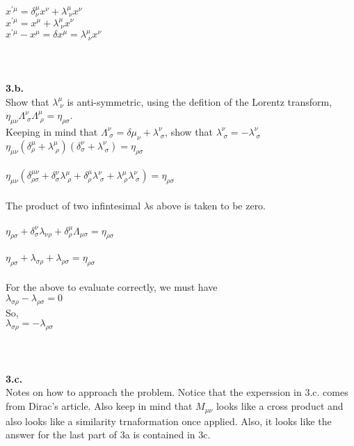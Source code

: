 \documentclass[prb,preprint]
{revtex4-1}
\newcommand{\PRLsep}{\noindent\makebox[\linewidth]{\resizebox{0.8888\linewidth}{2pt}{$\bullet$}}\bigskip}
\begin{document}
\\
$x^{\prime\mu} = \delta^\mu_\nu x^\nu + \lambda^\mu_{\;\nu}x^\nu $
\\
$x^{\prime\mu} = x^\mu + \lambda^\mu_{\;\nu}x^\nu $
\\
$x^{\prime\mu} - x^\mu = \delta x^\mu = \lambda^\mu_{\;\nu}x^\nu $
\\
\\
\PRLsep
\\
\\
\newpage
\textbf{3.b.}
\\
Show that $\lambda^\mu_{\;\nu}$ is anti-symmetric, using the defition of the Lorentz transform, $\eta_{\mu\nu} \Lambda^\nu_{\;\sigma}\Lambda^\mu_{\;\rho} = \eta_{\rho\sigma}$.
\\
Keeping in mind that $\Lambda^\nu_{\;\sigma} = \delta\mu_\nu + \lambda^\nu_{\;\sigma}$, show that $\lambda^\nu_{\;\sigma} = -\lambda^\nu_{\;\sigma}$
\\
$\eta_{\mu\nu}\left(\delta^\mu_\rho+ \lambda^\mu_{\;\rho}\right)\left(\delta^\nu_\sigma + \lambda^\nu_{\;\sigma}\right) = \eta_{\rho\sigma}$
\\
\\
$\eta_{\mu\nu}\left(\delta^{\mu\nu}_{\rho\sigma} + \delta^\nu_\sigma \lambda^\mu_{\;\rho} + \delta^\mu_\rho \lambda^\nu_{\;\sigma} + \lambda^\mu_{\;\rho}\lambda^\nu_{\;\sigma}\right) = \eta_{\rho\sigma}$
\\
\\
The product of two infintesimal $\lambda$s above is taken to be zero.
\\
\\
$\eta_{\rho\sigma} + \delta^\nu_\sigma \lambda_{\nu\rho} + \delta^\mu_\rho\Lambda_{\mu\sigma} = \eta_{\rho\sigma}$
\\
\\
$\eta_{\rho\sigma} + \lambda_{\sigma\rho} + \lambda_{\rho\sigma} = \eta_{\rho\sigma}$
\\
\\
For the above to evaluate correctly, we must have 
\\
$\lambda_{\sigma\rho} - \lambda_{\rho\sigma} = 0$
\\
So, 
\\
$\lambda_{\sigma\rho} = -\lambda_{\rho\sigma}$
\\
\\
\PRLsep
\\
\\
\newpage
\textbf{3.c.}
\\
Notes on how to approach the problem.  Notice that the experssion in 3.c. comes from Dirac's article.  Also keep in mind that $M_{\mu\nu}$ looks like a cross product and also looks like a similarity trnaformation once applied.  Also, it looks like the answer for the last part of 3a is contained in 3c. 
\end{document}
